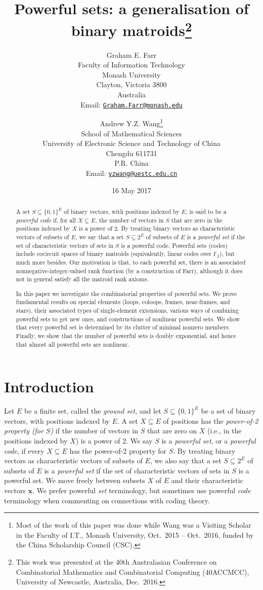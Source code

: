 \documentclass[12pt]{article}
\title{\vspace{-1.6cm}
Powerful sets: a generalisation of binary matroids\thanks{This work was presented at the 40th Australasian Conference on Combinatorial Mathematics and Combinatorial Computing (40ACCMCC), University of Newcastle, Australia, Dec.\ 2016.}}
\author{Graham E. Farr   \\
Faculty of Information Technology   \\
Monash University   \\
Clayton, Victoria 3800   \\
Australia   \\
Email: \href{mailto:Graham.Farr@monash.edu}{\texttt{Graham.Farr@monash.edu}}
\and
Andrew Y.Z. Wang\thanks{Most of the work of this paper was done while Wang was
a Visiting Scholar in the Faculty of I.T., Monash University, Oct.\ 2015 -- Oct.\ 2016,
funded by the China Scholarship Council (CSC).}   \\
School of Mathematical Sciences   \\
University of Electronic Science and Technology of China   \\
Chengdu 611731   \\
P.R. China   \\
Email: \href{mailto:yzwang@uestc.edu.cn}{\texttt{yzwang@uestc.edu.cn}}
}
\date{16 May 2017}
\begin{document}
\maketitle

\begin{abstract}
A set $S\subseteq\{0,1\}^E$ of binary vectors, with positions indexed by $E$, is said to be
a \textit{powerful code} if, for all $X\subseteq E$, the number of vectors in $S$ that are zero
in the positions indexed by $X$ is a power of 2.  By treating binary vectors as characteristic
vectors of subsets of $E$, we say that a set $S\subseteq2^E$ of subsets of $E$ is a
\textit{powerful set} if the set of characteristic vectors of sets in $S$ is a powerful code.
Powerful sets (codes) include cocircuit spaces of binary matroids (equivalently,
linear codes over $\mathbb{F}_2$), but much more besides. Our motivation is that,
to each powerful set, there is an associated nonnegative-integer-valued rank function (by a construction
of Farr), although it does not in general satisfy all the matroid rank axioms.

In this paper we investigate the
combinatorial properties of powerful sets.  We prove fundamental results on special
elements (loops, coloops, frames, near-frames, and stars), their associated types of
single-element extensions, various ways of combining powerful sets to get new ones,
and constructions of nonlinear powerful sets.
We show that every powerful set is determined by its clutter
of minimal nonzero members.  Finally, we show that the number of powerful sets is doubly
exponential, and hence that almost all powerful sets are nonlinear.
\end{abstract}


\section{Introduction}
\label{sec:intro}

Let $E$ be a finite set, called the \textit{ground set}, and let
$S\subseteq\{0,1\}^E$ be a set of binary vectors, with positions indexed by $E$.
A set $X\subseteq E$ of positions has the \emph{power-of-2 property (for $S$)} if
the number of vectors in $S$ that are zero on $X$
(i.e., in the positions indexed by $X$) is a power of 2.
We say $S$ is a \textit{powerful set}, or a \textit{powerful code},
if every $X\subseteq E$ has the power-of-2 property for $S$.
By treating binary vectors as characteristic
vectors of subsets of $E$, we also say that a set $S\subseteq2^E$ of subsets of $E$ is a
\textit{powerful set} if the set of characteristic vectors of sets in $S$ is a powerful set.
We move freely between subsets $X$ of $E$ and their characteristic vectors $\mathbf{x}$.
We prefer powerful \textit{set} terminology, but sometimes use powerful \textit{code}
terminology when commenting on connections with coding theory.
\end{document}
